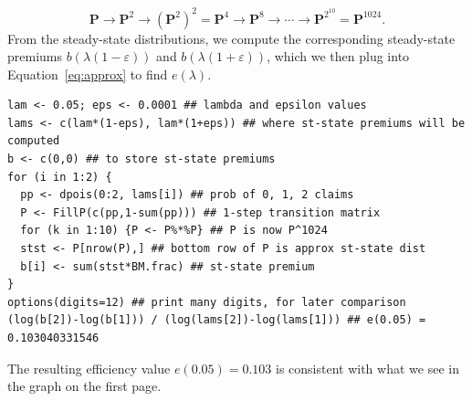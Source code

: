 \documentclass{article}
\begin{document}
\[\mathbf{P} \to \mathbf{P}^2 \to (\mathbf{P}^2)^2 = \mathbf{P}^4 \to \mathbf{P}^8 \to \cdots \to \mathbf{P}^{2^{10}} = \mathbf{P}^{1024}.\]
From the steady-state distributions, we compute the corresponding steady-state premiums $b(\lambda(1 - \varepsilon))$ and $b(\lambda(1 + \varepsilon))$, which we then plug into Equation~\ref{eq:approx} to find $e(\lambda)$.
 
\begin{lstlisting}
lam <- 0.05; eps <- 0.0001 ## lambda and epsilon values
lams <- c(lam*(1-eps), lam*(1+eps)) ## where st-state premiums will be computed
b <- c(0,0) ## to store st-state premiums
for (i in 1:2) {
  pp <- dpois(0:2, lams[i]) ## prob of 0, 1, 2 claims
  P <- FillP(c(pp,1-sum(pp))) ## 1-step transition matrix
  for (k in 1:10) {P <- P%*%P} ## P is now P^1024
  stst <- P[nrow(P),] ## bottom row of P is approx st-state dist
  b[i] <- sum(stst*BM.frac) ## st-state premium
}
options(digits=12) ## print many digits, for later comparison
(log(b[2])-log(b[1])) / (log(lams[2])-log(lams[1])) ## e(0.05) = 0.103040331546
\end{lstlisting}
The resulting efficiency value $e(0.05) = 0.103$ is consistent with what we see in the graph on the first page.
\clearpage
\end{document}
